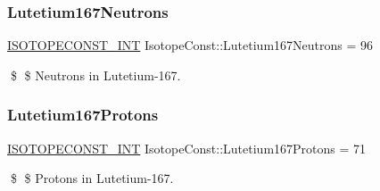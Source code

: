 \subsubsection{\texorpdfstring{Lutetium167\+Neutrons}{Lutetium167Neutrons}}
{\footnotesize\ttfamily \mbox{\hyperlink{group___isotope_const-_macros_ga5f18360b3e99483a35c32d789e62621c}{I\+S\+O\+T\+O\+P\+E\+C\+O\+N\+S\+T\+\_\+\+I\+NT}} Isotope\+Const\+::\+Lutetium167\+Neutrons = 96}

\$ \$ Neutrons in Lutetium-\/167. \mbox{\label{group___isotope_const-_lutetium-_lu167_gae8925895cb19bae70d1c33a06c7b356a}} 
\subsubsection{\texorpdfstring{Lutetium167\+Protons}{Lutetium167Protons}}
{\footnotesize\ttfamily \mbox{\hyperlink{group___isotope_const-_macros_ga5f18360b3e99483a35c32d789e62621c}{I\+S\+O\+T\+O\+P\+E\+C\+O\+N\+S\+T\+\_\+\+I\+NT}} Isotope\+Const\+::\+Lutetium167\+Protons = 71}

\$ \$ Protons in Lutetium-\/167. 